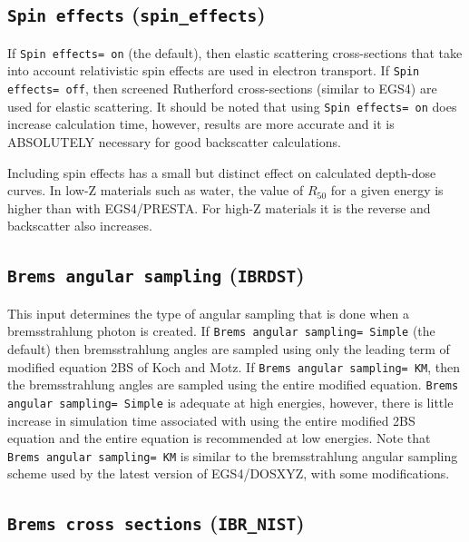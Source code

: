 \documentclass[12pt,twoside]{article}      %
\begin{document}
\subsection{{\tt Spin effects} ({\tt spin\_effects})}

If {\tt Spin effects= on} (the default), then elastic scattering
cross-sections that take into account relativistic spin effects are used
in electron transport.  If {\tt Spin effects= off},  then
screened Rutherford cross-sections (similar to EGS4) are used for elastic
scattering.  It should be noted that using {\tt Spin effects= on} does
increase calculation time, however, results are more accurate and it
is ABSOLUTELY necessary for good backscatter calculations.

Including spin effects has a small but distinct effect on calculated
depth-dose curves.  In low-Z materials such as water, the value of
$R_{50}$ for a given energy is higher than with EGS4/PRESTA. For high-Z
materials it is the reverse and backscatter also increases.


\subsection{{\tt Brems angular sampling} ({\tt IBRDST})}

This input determines the type of angular sampling that is done when
a bremsstrahlung photon is created.   If {\tt Brems angular sampling= Simple}
(the default) then bremsstrahlung angles are sampled using only the leading
term of modified equation 2BS of Koch and Motz\cite{Bi89,KM59}. If
{\tt Brems angular sampling= KM}, then the bremsstrahlung angles are sampled
using the entire modified equation.
{\tt Brems angular sampling= Simple} is adequate at high energies,
however, there is little increase in simulation time associated with using
the entire modified 2BS equation and the entire equation is recommended
at low energies.
Note that {\tt Brems angular sampling= KM} is similar to the bremsstrahlung
angular sampling scheme used by the latest version of EGS4/DOSXYZ, with some
modifications.

\subsection{{\tt Brems cross sections} ({\tt IBR\_NIST})}
\end{document}
